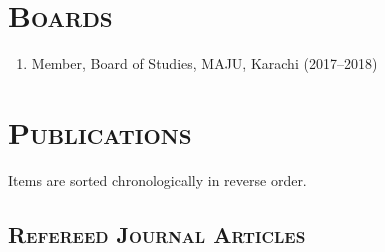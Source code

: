 \documentclass[a4paper, 10pt]{article}
\begin{document}
\section*{\normalfont\textsc{Boards}}
\begin{enumerate}
\itemsep-4pt 
\item Member, Board of Studies, MAJU, Karachi (2017--2018)
\end{enumerate}

\section*{\normalfont\textsc{Publications}}
\vspace{-1em}Items are sorted chronologically in reverse order.
\subsection*{\normalfont\textsc{ Refereed Journal Articles}}
\end{document}
